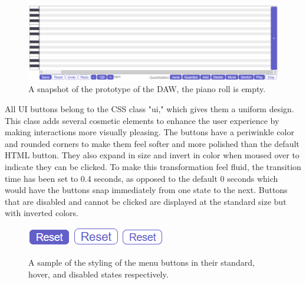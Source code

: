 \begin{figure}[h!]
  \centering
  \includegraphics[width=\linewidth]{image/Static.png}
  \caption{A snapshot of the prototype of the DAW, the piano roll is empty.}
  \label{fig:static}
\end{figure}

All UI buttons belong to the CSS class "ui," which gives them a uniform design. This class adds
several cosmetic elements to enhance the user experience by making interactions more visually
pleasing. The buttons have a periwinkle color and rounded corners to make them feel softer and
more polished than the default HTML button. They also expand in size and invert in color when
moused over to indicate they can be clicked. To make this transformation feel fluid, the transition
time has been set to 0.4 seconds, as opposed to the default 0 seconds which would have the buttons
snap immediately from one state to the next. Buttons that are disabled and cannot be clicked are
displayed at the standard size but with inverted colors.

\begin{figure}[h!]
  \centering
  \includegraphics{image/StdUI.png}
  \includegraphics{image/HoverUI.png}
  \includegraphics{image/DisabledUI.png}
  \caption{A sample of the styling of the menu buttons in their standard, hover, and disabled states respectively.}
  \label{fig:ui_variations}
\end{figure}

